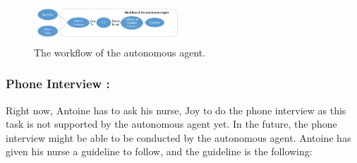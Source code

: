 \documentclass{article}
\begin{document}
    \begin{figure}[h]
        \begin{center}
        \includegraphics[width=0.5\textwidth]{workflow_agent}
        \end{center}
        \caption{The workflow of the autonomous agent.}
        \label{figure:workflow_agent}
    \end{figure}
    
    \subsubsection{Phone Interview :}
    Right now, Antoine has to ask his nurse, Joy to do the phone interview as this task is not supported by the autonomous agent yet. 
    In the future, the phone interview might be able to be conducted by the autonomous agent.
    Antoine has given his nurse a guideline to follow, and the guideline is the following:
    
\end{document}
